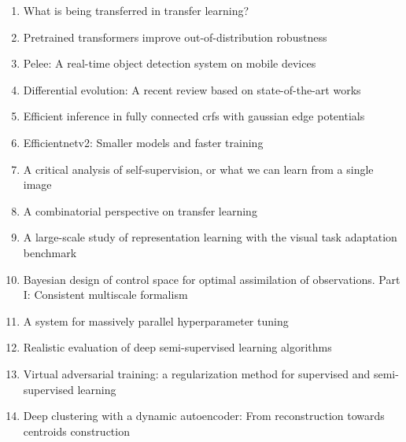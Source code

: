 \documentclass[acmlarge]{acmart}
\begin{document}
\begin{enumerate}
	\item What is being transferred in transfer learning? \cite{neyshabur2020being} 

	\item Pretrained transformers improve out-of-distribution robustness \cite{hendrycks2020pretrained} 

	\item Pelee: A real-time object detection system on mobile devices \cite{wang2018pelee} 

	\item Differential evolution: A recent review based on state-of-the-art works \cite{ahmad2021differential} 

	\item Efficient inference in fully connected crfs with gaussian edge potentials \cite{krahenbuhl2011efficient} 

	\item Efficientnetv2: Smaller models and faster training \cite{tan2021efficientnetv2} 

	\item A critical analysis of self-supervision, or what we can learn from a single image \cite{asano2019critical} 

	\item A combinatorial perspective on transfer learning \cite{wang2020combinatorial} 

	\item A large-scale study of representation learning with the visual task adaptation benchmark \cite{zhai2019large} 

	\item Bayesian design of control space for optimal assimilation of observations. Part I: Consistent multiscale formalism \cite{bocquet2011bayesian} 

	\item A system for massively parallel hyperparameter tuning \cite{li2020system} 

	\item Realistic evaluation of deep semi-supervised learning algorithms \cite{oliver2018realistic} 

	\item Virtual adversarial training: a regularization method for supervised and semi-supervised learning \cite{miyato2018virtual} 

	\item Deep clustering with a dynamic autoencoder: From reconstruction towards centroids construction \cite{mrabah2020deep} 


\end{enumerate}
\end{document}
